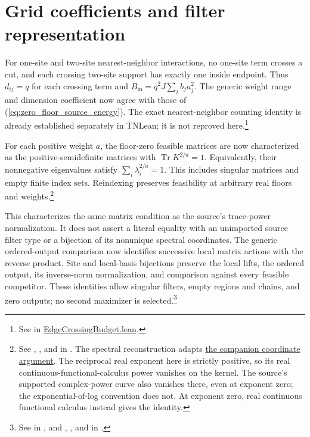 \documentclass{article}
\begin{document}
\section{Grid coefficients and filter representation}

For one-site and two-site nearest-neighbor interactions, no one-site term
crosses a cut, and each crossing two-site support has exactly one inside
endpoint. Thus $d_{ij}=q$ for each crossing term and
$B_{\mathrm{in}}=q^2J\sum_j b_j a_j^2$. The generic weight range and
dimension coefficient now agree with those of
(\ref{eq:zero_floor_source_energy}). The exact nearest-neighbor
counting identity is already established separately in TNLean; it is
not reproved here.\footnote{See
 in
\href{https://github.com/LionSR/TNLean/blob/0afd1775b8ef7861082bab9a4d0fcb5f006792ac/TNLean/PEPS/AreaLaw/EdgeCrossingBudget.lean\#L154-L172}{EdgeCrossingBudget.lean}.}

For each positive weight $a$, the floor-zero feasible matrices are now
characterized as the positive-semidefinite matrices with
$\operatorname{Tr} K^{2/a}=1$. Equivalently, their nonnegative eigenvalues satisfy
$\sum_i\lambda_i^{2/a}=1$. This includes singular matrices and empty
finite index sets. Reindexing preserves feasibility at arbitrary real
floors and weights.\footnote{See
,
, and
 in
.
The spectral reconstruction adapts
\href{https://github.com/openai/math/blob/adc7f1241b42e322a6451854ab7e4b4c146bf78a/lean/OAI/MathematicalPhysics/PEPSFilters/Coordinates.lean\#L114-L132}{the companion coordinate argument}.
The reciprocal real exponent here is strictly positive, so its real
continuous-functional-calculus power vanishes on the kernel. The
source's supported complex-power curve also vanishes there, even at
exponent zero; the exponential-of-log convention does not. At exponent
zero, real continuous functional calculus instead gives the identity.}

This characterizes the same matrix condition as the source's trace-power
normalization. It does not assert a literal equality with an unimported
source filter type or a bijection of its nonunique spectral coordinates.
The generic ordered-output comparison now identifies successive local
matrix actions with the reverse product. Site and local-basis bijections
preserve the local lifts, the ordered output, its inverse-norm normalization,
and comparison against every feasible competitor. These identities allow
singular filters, empty regions and chains, and zero outputs; no second
maximizer is selected.\footnote{See
 in
, and
,
, and
 in
.}
\end{document}
